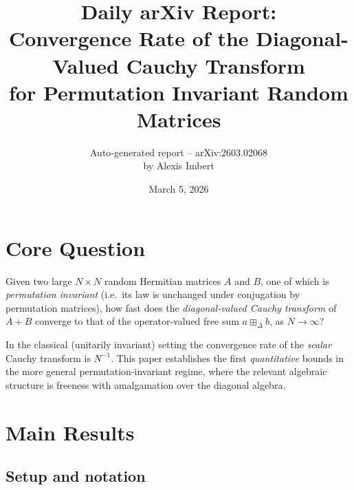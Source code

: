 \documentclass[11pt,a4paper]{article}
\title{Daily arXiv Report:\\Convergence Rate of the Diagonal-Valued Cauchy Transform\\for Permutation Invariant Random Matrices}
\author{Auto-generated report -- arXiv:2603.02068\\by Alexis Imbert}
\date{March 5, 2026}
\begin{document}
\maketitle

\section{Core Question}

Given two large $N\times N$ random Hermitian matrices $A$ and $B$, one of which is \emph{permutation invariant} (i.e.\ its law is unchanged under conjugation by permutation matrices), how fast does the \emph{diagonal-valued Cauchy transform} of $A+B$ converge to that of the operator-valued free sum $a \boxplus_\Delta b$, as $N\to\infty$?

In the classical (unitarily invariant) setting the convergence rate of the \emph{scalar} Cauchy transform is $N^{-1}$. This paper establishes the first \emph{quantitative} bounds in the more general permutation-invariant regime, where the relevant algebraic structure is freeness with amalgamation over the diagonal algebra.

\section{Main Results}

\subsection*{Setup and notation}
\end{document}
